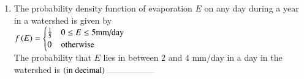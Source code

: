 \documentclass[journal,12pt,onecolumn]{IEEEtran}
\theoremstyle{remark}
\begin{document}
\begin{enumerate}
\item The probability density function of evaporation $E$ on any day during a year in a watershed is given by\\
$f\left(E\right) = 
\begin{cases}
\frac{1}{5} & 0\leq E \leq 5 \text{mm/day}\\
0 & \text{otherwise}
\end{cases}$\\
The probability that $E$ lies in between $2$ and $4$ mm/day in a day in the watershed is $\brak{\text{in decimal}}\rule{2cm}{0.1pt}$
\hfill{}



\end{enumerate}
\end{document}
